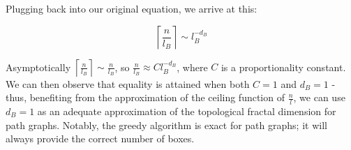 Plugging back into our original equation, we arrive at this:

\begin{equation} 
	\left\lceil \frac{n}{l_B} \right\rceil \sim l_B^{-d_B} 
\end{equation}

Asymptotically $\left\lceil \frac{n}{l_B} \right\rceil \sim \frac{n}{l_B} $, so $\frac{n}{l_B} \approx C l_B^{-d_B} $, where $C$ is a proportionality constant. We can then observe that equality is attained when both $C=1$ and $d_B=1$ - thus, benefiting from the approximation of the ceiling function of $\frac{n}{l}$, we can use $d_B=1$ as an adequate approximation of the topological fractal dimension for path graphs. Notably, the greedy algorithm is exact for path graphs; it will always provide the correct number of boxes.





